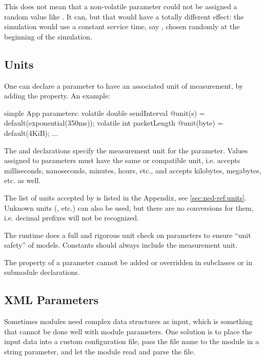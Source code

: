 \begin{note}
    This does not mean that a non-volatile parameter could not be assigned a
    random value like . It can, but that would
    have a totally different effect: the simulation would use a constant
    service time, say , chosen randomly at the beginning
    of the simulation.
\end{note}

\subsection{Units}
\label{sec:ned-lang:units}

One can declare a parameter to have an associated unit of measurement,
by adding the  property. An example:

\begin{ned}
simple App
{
    parameters:
        volatile double sendInterval @unit(s) = default(exponential(350ms));
        volatile int packetLength @unit(byte) = default(4KiB);
    ...
}
\end{ned}

The  and  declarations specify the measurement unit
for the parameter. Values assigned to parameters must have the same or
compatible unit, i.e.  accepts milliseconds, nanoseconds,
minutes, hours, etc., and  accepts kilobytes, megabytes,
etc. as well.

\begin{note}
    The list of units accepted by {\opp} is listed in the Appendix, see
    \ref{sec:ned-ref:units}. Unknown units (, etc.)
    can also be used, but there are no conversions for them,
    i.e. decimal prefixes will not be recognized.
\end{note}

The {\opp} runtime does a full and rigorous unit check on
parameters to ensure ``unit safety'' of models. Constants should
always include the measurement unit.

The  property of a parameter cannot be added or overridden
in subclasses or in submodule declarations.


\subsection{XML Parameters}
\label{sec:ned-lang:xml-parameters}

Sometimes modules need complex data structures as input, which is something
that cannot be done well with module parameters. One solution is to place
the input data into a custom configuration file, pass the file name to the
module in a string parameter, and let the module read and parse the file.

